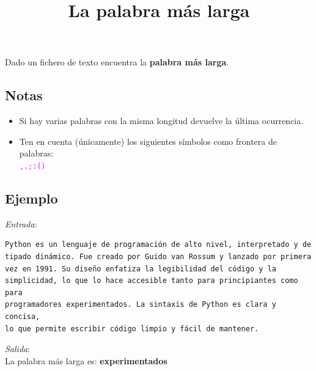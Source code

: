\documentclass[12pt,a4paper]{article}
\title{\textbf{La palabra más larga}}
\begin{document}
\maketitle

Dado un fichero de texto encuentra la \textbf{palabra más larga}.

\subsection*{Notas}

\begin{itemize}
    \item Si hay varias palabras con la misma longitud devuelve la última ocurrencia.
    \item Ten en cuenta (únicamente) los siguientes símbolos como frontera de palabras:\\\textcolor{magenta}{\texttt{,.;:()}}
\end{itemize}

\subsection*{Ejemplo}

\textit{Entrada}:
\begin{verbatim}
Python es un lenguaje de programación de alto nivel, interpretado y de
tipado dinámico. Fue creado por Guido van Rossum y lanzado por primera
vez en 1991. Su diseño enfatiza la legibilidad del código y la
simplicidad, lo que lo hace accesible tanto para principiantes como para
programadores experimentados. La sintaxis de Python es clara y concisa,
lo que permite escribir código limpio y fácil de mantener.
\end{verbatim}

\textit{Salida}:\\

La palabra más larga es: \textbf{experimentados}
\end{document}
